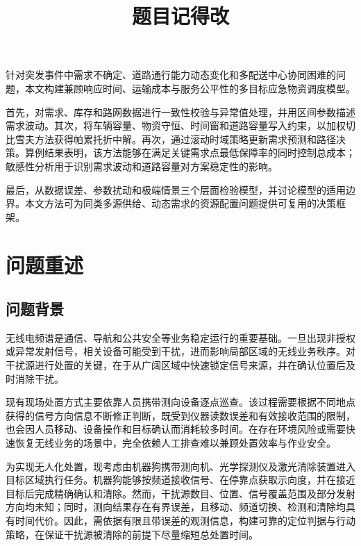 \documentclass[zihao=-4,a4paper,UTF8,fontset=none]{ctexart}
\title{题目记得改}
\newcommand{\keywords}{关键词1；关键词2}
\begin{document}
\maketitle

\begin{cumcmabstract}
针对突发事件中需求不确定、道路通行能力动态变化和多配送中心协同困难的问题，本文构建兼顾响应时间、运输成本与服务公平性的多目标应急物资调度模型。

首先，对需求、库存和路网数据进行一致性校验与异常值处理，并用区间参数描述需求波动。其次，将车辆容量、物资守恒、时间窗和道路容量写入约束，以加权切比雪夫方法获得帕累托折中解。再次，通过滚动时域策略更新需求预测和路径决策。算例结果表明，该方法能够在满足关键需求点最低保障率的同时控制总成本；敏感性分析用于识别需求波动和道路容量对方案稳定性的影响。

最后，从数据误差、参数扰动和极端情景三个层面检验模型，并讨论模型的适用边界。本文方法可为同类多源供给、动态需求的资源配置问题提供可复用的决策框架。

\cumcmkeywords{\keywords}
\end{cumcmabstract}


\section{问题重述}

\subsection{问题背景}

无线电频谱是通信、导航和公共安全等业务稳定运行的重要基础。一旦出现非授权或异常发射信号，相关设备可能受到干扰，进而影响局部区域的无线业务秩序。对干扰源进行处置的关键，在于从广阔区域中快速锁定信号来源，并在确认位置后及时消除干扰。

现有现场处置方式主要依靠人员携带测向设备逐点巡查。该过程需要根据不同地点获得的信号方向信息不断修正判断，既受到仪器读数误差和有效接收范围的限制，也会因人员移动、设备操作和目标确认而消耗较多时间。在存在环境风险或需要快速恢复无线业务的场景中，完全依赖人工排查难以兼顾处置效率与作业安全。

为实现无人化处置，现考虑由机器狗携带测向机、光学探测仪及激光清除装置进入目标区域执行任务。机器狗能够按频道接收信号、在停靠点获取示向度，并在接近目标后完成精确确认和清除。然而，干扰源数目、位置、信号覆盖范围及部分发射方向均未知；同时，测向结果存在有界误差，且移动、频道切换、检测和清除均具有时间代价。因此，需依据有限且带误差的观测信息，构建可靠的定位判据与行动策略，在保证干扰源被清除的前提下尽量缩短总处置时间。
\end{document}

